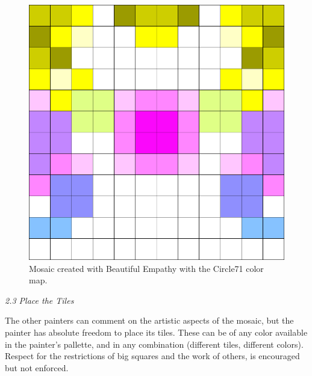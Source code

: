 \documentclass[twocolumn]{article}
\newcommand{\sublvl}[1]{\vspace{0.3cm}\Large{\textit{#1}}\vspace{0.1cm}}
\begin{document}
\begin{figure}[b!]
\centering
\includegraphics[scale=0.25]{last_mosaic_sario.png}
\caption{Mosaic created with Beautiful Empathy with the Circle71 color map.}
\label{fig:mosaic}
\end{figure}

\newpage
\sublvl{2.3 Place the Tiles}

The other painters can comment on the artistic aspects of the mosaic, but the painter has absolute freedom to place its tiles. These can be of any color available in the painter's pallette, and in any combination (different tiles, different colors). Respect for the restrictions of big squares and the work of others, is encouraged but not enforced.
% 
% 
% 
% 
\end{document}
